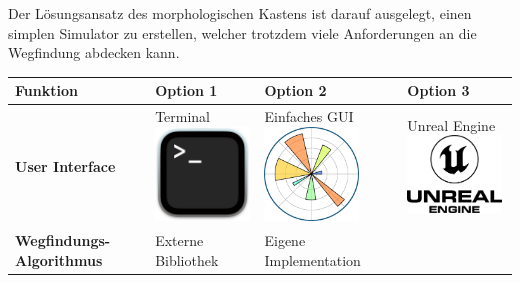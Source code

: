 \documentclass[../main.tex]{subfiles}
\begin{document}
Der Lösungsansatz des morphologischen Kastens ist darauf ausgelegt, einen simplen Simulator zu erstellen, welcher trotzdem viele Anforderungen an die Wegfindung abdecken kann.


\begin{table}[htbp!]
    \centering
    \begin{tabularx}{\textwidth}{| X | Y | Y | Y |}
        \hline

        \textbf{Funktion} & \textbf{Option 1} & \textbf{Option 2} & \textbf{Option 3} \\ \hline
        
        \textbf{User Interface} &     
        Terminal \newline
        \includegraphics[width=2.5cm]{img/simulation/morphologischer-kasten/terminal.png}
        &
        Einfaches GUI \newline
        \includegraphics[width=2.5cm]{img/simulation/morphologischer-kasten/simple-gui.png}
        &
        Unreal Engine \newline
        \includegraphics[width=2.5cm]{img/simulation/morphologischer-kasten/unreal-engine-logo.png}
        \\ \hline
        
        \textbf{Wegfindungs-Algorithmus}  &
        Externe Bibliothek &
        Eigene Implementation &
        \\ \hline
        

\end{tabularx}
\end{table}
\end{document}
